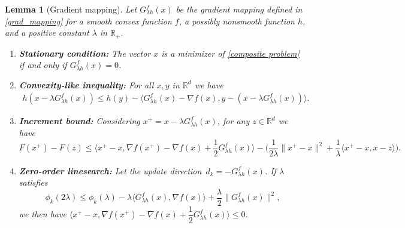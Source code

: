 \documentclass[11pt, a4paper, oneside, reqno]{amsart}
\newtheorem{lemma}[theorem]{Lemma}
\begin{document}
\begin{lemma}[Gradient mapping]\label{keylemma}
Let $G^{f}_{\lambda h}(x)$ be the gradient mapping defined in \eqref{grad_mapping} for a smooth convex function $f$, a possibly nonsmooth function $h$, and a positive constant $\lambda$ in $\mathbb{R}_+$.
\begin{enumerate}[label=(\roman*), itemsep = 0mm, topsep = 0mm, leftmargin = 7mm]
\item \label{lema3}
{\bf Stationary condition:} The vector $x$ is a minimizer of \eqref{composite problem} if and only if $G^{f}_{\lambda h}(x) = 0$.

\item \label{lema1}
{\bf Convexity-like inequality:} For all $x,y$ in $\mathbb{R}^d$ we have
\begin{align*}
    h\left(x-\lambda G^{f}_{\lambda h}(x)\right) \leq h(y) - \langle G^{f}_{\lambda h}(x) - \nabla f(x), y - (x - \lambda G^{f}_{\lambda h}(x)) \rangle.  %
\end{align*}

\item \label{lema2}
{\bf Increment bound:} Considering $x^+ = x - \lambda G^{f}_{\lambda h}(x)$, for any $z \in \mathbb{R}^d$ we have
\begin{equation*}\label{eq3}
F(x^+) - F(z) \leq \langle x^+ - x,  \nabla f(x^+) - \nabla f(x) + \dfrac{1}{2}G^{f}_{\lambda h}(x) \rangle - \Big( \dfrac{1}{2\lambda} \|x^+ - x\|^2 + \dfrac{1}{\lambda}\langle x^+ -x, x - z \rangle \Big).
\end{equation*}

\item \label{lema4linesearch}
{\bf Zero-order linesearch:} Let the update direction~$d_k = -G^{f}_{\lambda h}(x)$. If $\lambda$ satisfies
\begin{equation}\label{ZO linesearch}
    \phi_k(2\lambda) \leq \phi_k(\lambda) - \lambda \langle G^{f}_{\lambda h}(x), \nabla f(x) \rangle + \dfrac{\lambda}{2}\|G^{f}_{\lambda h}(x)\|^2,
\end{equation}
we then have $\langle x^+ - x,  \nabla f(x^+) - \nabla f(x) + \dfrac{1}{2}G^{f}_{\lambda h}(x) \rangle \leq 0$.
\end{enumerate}
\end{lemma}
\end{document}
